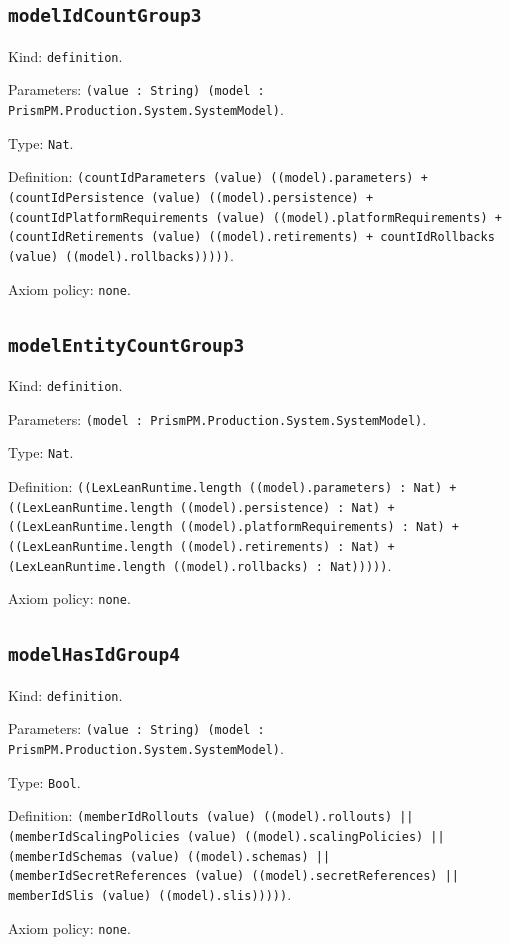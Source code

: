 \documentclass[11pt]{article}
\begin{document}
\subsection*{\texttt{modelIdCountGroup3}}
\noindent Kind: \texttt{definition}.\par
\noindent Parameters: \texttt{(value : String) (model : PrismPM.Production.System.SystemModel)}.\par
\noindent Type: \texttt{Nat}.\par
\noindent Definition: \texttt{(countIdParameters (value) ((model).parameters) + (countIdPersistence (value) ((model).persistence) + (countIdPlatformRequirements (value) ((model).platformRequirements) + (countIdRetirements (value) ((model).retirements) + countIdRollbacks (value) ((model).rollbacks)))))}.\par
\noindent Axiom policy: \texttt{none}.\par
\subsection*{\texttt{modelEntityCountGroup3}}
\noindent Kind: \texttt{definition}.\par
\noindent Parameters: \texttt{(model : PrismPM.Production.System.SystemModel)}.\par
\noindent Type: \texttt{Nat}.\par
\noindent Definition: \texttt{((LexLeanRuntime.length ((model).parameters) : Nat) + ((LexLeanRuntime.length ((model).persistence) : Nat) + ((LexLeanRuntime.length ((model).platformRequirements) : Nat) + ((LexLeanRuntime.length ((model).retirements) : Nat) + (LexLeanRuntime.length ((model).rollbacks) : Nat)))))}.\par
\noindent Axiom policy: \texttt{none}.\par
\subsection*{\texttt{modelHasIdGroup4}}
\noindent Kind: \texttt{definition}.\par
\noindent Parameters: \texttt{(value : String) (model : PrismPM.Production.System.SystemModel)}.\par
\noindent Type: \texttt{Bool}.\par
\noindent Definition: \texttt{(memberIdRollouts (value) ((model).rollouts) || (memberIdScalingPolicies (value) ((model).scalingPolicies) || (memberIdSchemas (value) ((model).schemas) || (memberIdSecretReferences (value) ((model).secretReferences) || memberIdSlis (value) ((model).slis)))))}.\par
\noindent Axiom policy: \texttt{none}.\par
\end{document}

